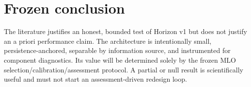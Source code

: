 \documentclass[10pt]{article}
\begin{document}
\section{Frozen conclusion}

The literature justifies an honest, bounded test of Horizon v1 but does not
justify an a priori performance claim. The architecture is intentionally
small, persistence-anchored, separable by information source, and instrumented
for component diagnostics. Its value will be determined solely by the frozen
MLO selection/calibration/assessment protocol. A partial or null result is
scientifically useful and must not start an assessment-driven redesign loop.

\begingroup
\small


\endgroup
\end{document}
